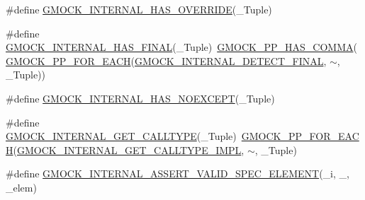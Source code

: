 \begin{DoxyCompactItemize}
\item 
\#define \mbox{\hyperlink{_obj__test_2lib_2googletest-master_2googlemock_2include_2gmock_2gmock-function-mocker_8h_aef5aaab325100a13fee33dd6029463dd}{G\+M\+O\+C\+K\+\_\+\+I\+N\+T\+E\+R\+N\+A\+L\+\_\+\+H\+A\+S\+\_\+\+O\+V\+E\+R\+R\+I\+DE}}(\+\_\+\+Tuple)
\item 
\#define \mbox{\hyperlink{_obj__test_2lib_2googletest-master_2googlemock_2include_2gmock_2gmock-function-mocker_8h_a1c4b4308770f5ff925ba9ed1bf578644}{G\+M\+O\+C\+K\+\_\+\+I\+N\+T\+E\+R\+N\+A\+L\+\_\+\+H\+A\+S\+\_\+\+F\+I\+N\+AL}}(\+\_\+\+Tuple)~\mbox{\hyperlink{_obj__test_2lib_2googletest-master_2googlemock_2include_2gmock_2internal_2gmock-pp_8h_aaf83e01e56eb26d7eac9efb477587510}{G\+M\+O\+C\+K\+\_\+\+P\+P\+\_\+\+H\+A\+S\+\_\+\+C\+O\+M\+MA}}(\mbox{\hyperlink{_obj__test_2lib_2googletest-master_2googlemock_2include_2gmock_2internal_2gmock-pp_8h_abc9368d9b0960531e3cfb9e5d6a41816}{G\+M\+O\+C\+K\+\_\+\+P\+P\+\_\+\+F\+O\+R\+\_\+\+E\+A\+CH}}(\mbox{\hyperlink{_obj__test_2lib_2googletest-master_2googlemock_2include_2gmock_2gmock-function-mocker_8h_a2b0f53a8fea3a79d52582daf294737b0}{G\+M\+O\+C\+K\+\_\+\+I\+N\+T\+E\+R\+N\+A\+L\+\_\+\+D\+E\+T\+E\+C\+T\+\_\+\+F\+I\+N\+AL}}, $\sim$, \+\_\+\+Tuple))
\item 
\#define \mbox{\hyperlink{_obj__test_2lib_2googletest-master_2googlemock_2include_2gmock_2gmock-function-mocker_8h_adfda8885b556882ad81e7ea73ce26cf1}{G\+M\+O\+C\+K\+\_\+\+I\+N\+T\+E\+R\+N\+A\+L\+\_\+\+H\+A\+S\+\_\+\+N\+O\+E\+X\+C\+E\+PT}}(\+\_\+\+Tuple)
\item 
\#define \mbox{\hyperlink{_obj__test_2lib_2googletest-master_2googlemock_2include_2gmock_2gmock-function-mocker_8h_a0408d6cf7e0952ffa068be1944b6e048}{G\+M\+O\+C\+K\+\_\+\+I\+N\+T\+E\+R\+N\+A\+L\+\_\+\+G\+E\+T\+\_\+\+C\+A\+L\+L\+T\+Y\+PE}}(\+\_\+\+Tuple)~\mbox{\hyperlink{_obj__test_2lib_2googletest-master_2googlemock_2include_2gmock_2internal_2gmock-pp_8h_abc9368d9b0960531e3cfb9e5d6a41816}{G\+M\+O\+C\+K\+\_\+\+P\+P\+\_\+\+F\+O\+R\+\_\+\+E\+A\+CH}}(\mbox{\hyperlink{_obj__test_2lib_2googletest-master_2googlemock_2include_2gmock_2gmock-function-mocker_8h_a917552654709591f0b38c20f16018b1e}{G\+M\+O\+C\+K\+\_\+\+I\+N\+T\+E\+R\+N\+A\+L\+\_\+\+G\+E\+T\+\_\+\+C\+A\+L\+L\+T\+Y\+P\+E\+\_\+\+I\+M\+PL}}, $\sim$, \+\_\+\+Tuple)
\item 
\#define \mbox{\hyperlink{_obj__test_2lib_2googletest-master_2googlemock_2include_2gmock_2gmock-function-mocker_8h_a6043d8b0a21556d205e729fa9c8da600}{G\+M\+O\+C\+K\+\_\+\+I\+N\+T\+E\+R\+N\+A\+L\+\_\+\+A\+S\+S\+E\+R\+T\+\_\+\+V\+A\+L\+I\+D\+\_\+\+S\+P\+E\+C\+\_\+\+E\+L\+E\+M\+E\+NT}}(\+\_\+i,  \+\_\+,  \+\_\+elem)

\end{DoxyCompactItemize}
